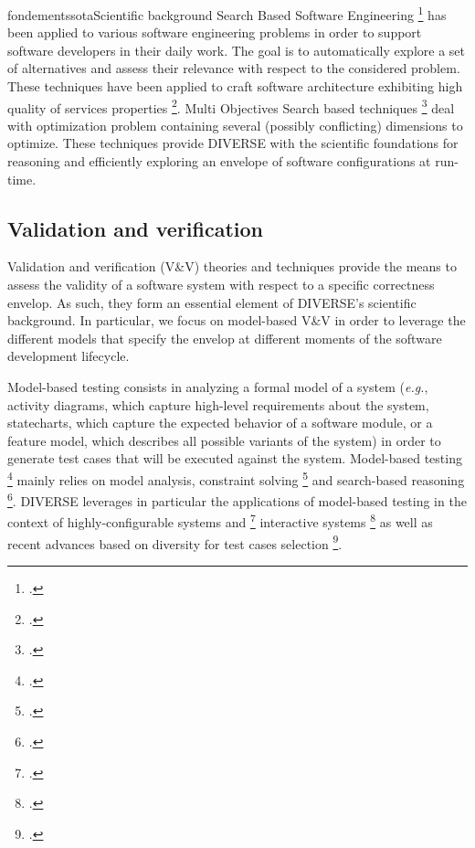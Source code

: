 \documentclass{ra2018}
\newcommand{\team}{DIVERSE}
\begin{document}
\begin{module}{fondements}{sota}{Scientific background}
Search Based Software Engineering   \footcite{harman2001search} has been applied to various software engineering problems in order to support software developers in their daily work.
The goal is to automatically  explore a set of alternatives and assess their relevance with respect to the considered problem. 
These techniques have been applied to craft software architecture exhibiting high quality of services properties   \footcite{frey2013search}. 
Multi  Objectives Search based techniques   \footcite{deb2002fast} deal with optimization problem containing several (possibly conflicting) dimensions to optimize. 
These techniques provide \team{} with the scientific foundations for reasoning and efficiently exploring an envelope of software configurations at run-time.
 


\subsection{Validation and verification}

Validation and verification (V\&V) theories and techniques provide the means to assess the validity of a software system with respect to a specific correctness envelop. As such, they form an essential element of \team{}'s scientific background. In particular, we focus on model-based V\&V in order to leverage the different models that specify the envelop at different moments of the software development lifecycle.

Model-based testing consists in analyzing a formal model of a system (\textit{e.g.}, activity diagrams, which capture high-level requirements about the system, statecharts, which capture the expected behavior of a software module, or a feature model, which describes all possible variants of the system) in order to generate test cases that will be executed against the system. Model-based testing   \footcite{utting2010practical} mainly relies on model analysis, constraint solving   \footcite{demilli1991constraint} and search-based reasoning   \footcite{mcminn2004search}. \team{} leverages in particular the applications of model-based testing in the context of highly-configurable systems and    \footcite{yilmaz2006covering} interactive systems   \footcite{memon2007event} as well as recent advances based on diversity for test cases selection   \footcite{HemmatiBAA10}.





\end{module}
\end{document}
